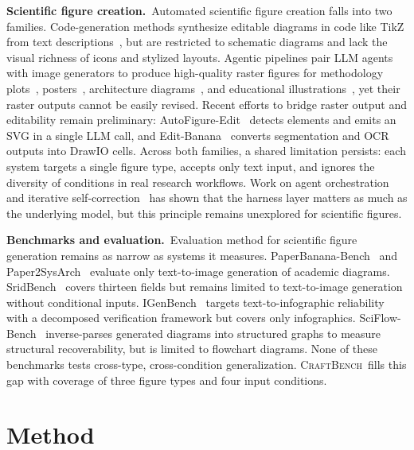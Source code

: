 \documentclass{article}
\newcommand{\CrafterBench}{\textsc{CraftBench}\xspace}
\begin{document}
\noindent\textbf{Scientific figure creation.}\
Automated scientific figure creation falls into two families. Code-generation methods synthesize editable diagrams in code like TikZ from text descriptions~\citep{belouadi2024automatikz,zala2024diagrammergpt,greisinger2026tikzilla}, but are restricted to schematic diagrams and lack the visual richness of icons and stylized layouts. Agentic pipelines pair LLM agents with image generators to produce high-quality raster figures for methodology plots~\citep{zhu2026paperbanana,zhu2026autofigure}, posters~\citep{sun2025p2p}, architecture diagrams~\citep{guo2026paper2sysarch}, and educational illustrations~\citep{kukreja2026cage,yang2026omnidiagram}, yet their raster outputs cannot be easily revised. Recent efforts to bridge raster output and editability remain preliminary: AutoFigure-Edit~\citep{lin2026autofigureedit} detects elements and emits an SVG in a single LLM call, and Edit-Banana~\citep{editbanana2026} converts segmentation and OCR outputs into DrawIO cells. Across both families, a shared limitation persists: each system targets a single figure type, accepts only text input, and ignores the diversity of conditions in real research workflows. Work on agent orchestration~\citep{young2025harness,pan2026nlaharnesses} and iterative self-correction~\citep{madaan2023selfrefine} has shown that the harness layer matters as much as the underlying model, but this principle remains unexplored for scientific figures.

\noindent\textbf{Benchmarks and evaluation.}\
Evaluation method for scientific figure generation remains as narrow as systems it measures. PaperBanana-Bench~\citep{zhu2026paperbanana} and Paper2SysArch~\citep{guo2026paper2sysarch} evaluate only text-to-image generation of academic diagrams. SridBench~\citep{chang2025sridbenchbenchmarkscientificresearch} covers thirteen fields but remains limited to text-to-image generation without conditional inputs. IGenBench~\citep{tang2026igenbench} targets text-to-infographic reliability with a decomposed verification framework but covers only infographics. SciFlow-Bench~\citep{zhang2026sciflowbench} inverse-parses generated diagrams into structured graphs to measure structural recoverability, but is limited to flowchart diagrams. None of these benchmarks tests cross-type, cross-condition
generalization. \CrafterBench\ fills this gap with coverage of
three figure types and four input conditions.



\section{Method}
\label{sec:method}
\end{document}
